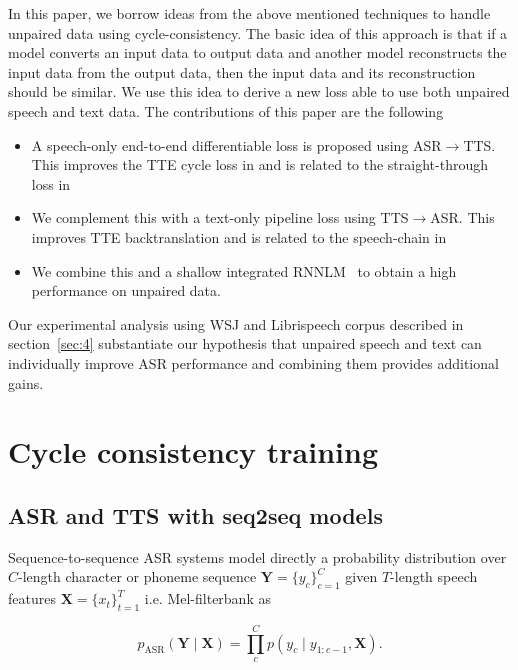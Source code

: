\documentclass[a4paper]{article}
\begin{document}
In this paper, we borrow ideas from the above mentioned techniques to handle unpaired data using cycle-consistency. The basic idea of this approach is that if a model converts an input data to output data and another model reconstructs the input data from the output data, then the input data and its reconstruction should be similar. We use this idea to derive a new loss able to use both unpaired speech and text data. The contributions of this paper are the following
\begin{itemize}
    \item A speech-only end-to-end differentiable loss is proposed using ASR$\rightarrow$TTS. This improves the TTE cycle loss in \cite{hori2018cycle} and is related to the straight-through loss in~\cite{tjandra2018end}
    \item We complement this with a text-only pipeline loss using TTS$\rightarrow$ASR. This improves TTE backtranslation \cite{hayashi2018back} and is related to the speech-chain in \cite{tjandra2017listening}
    \item We combine this and a shallow integrated RNNLM~\cite{hori2017advances,kannan2018analysis} to obtain a high performance on unpaired data.
\end{itemize}
Our experimental analysis using WSJ and Librispeech corpus described in section~\ref{sec:4} substantiate our hypothesis that unpaired speech and text can individually improve ASR performance and combining them provides additional gains.

\section{Cycle consistency training}\label{sec:2}

\subsection{ASR and TTS with seq2seq models}
Sequence-to-sequence ASR systems \cite{bahdanau2016end} model directly a probability distribution over $C$-length character or phoneme sequence $\mathbf{Y}=\{y_c\}_{c=1}^C$ given $T$-length speech features $\mathbf{X}=\{x_t\}_{t=1}^T$ i.e. Mel-filterbank as 

\begin{equation}
p_{\mathrm{ASR}}(\mathbf{Y}\mid\mathbf{X})=\prod_{c}^{C}p(y_{c}\mid{y}_{1:c-1},\mathbf{X})\label{eq:pyX}.
\end{equation}
\end{document}
